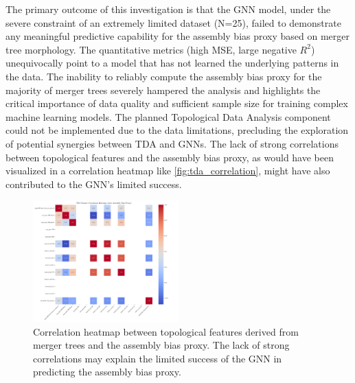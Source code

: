 \documentclass[twocolumn]{aastex631}
\begin{document}
The primary outcome of this investigation is that the GNN model, under the severe constraint of an extremely limited dataset (N=25), failed to demonstrate any meaningful predictive capability for the assembly bias proxy based on merger tree morphology. The quantitative metrics (high MSE, large negative $R^2$) unequivocally point to a model that has not learned the underlying patterns in the data. The inability to reliably compute the assembly bias proxy for the majority of merger trees severely hampered the analysis and highlights the critical importance of data quality and sufficient sample size for training complex machine learning models. The planned Topological Data Analysis component could not be implemented due to the data limitations, precluding the exploration of potential synergies between TDA and GNNs. The lack of strong correlations between topological features and the assembly bias proxy, as would have been visualized in a correlation heatmap like \autoref{fig:tda_correlation}, might have also contributed to the GNN's limited success.

\begin{figure}[htbp]
    \centering
    \includegraphics[width=0.5\textwidth]{../input_files/plots/tda_feature_correlation_heatmap_3_1748137556.png}
    \caption{\label{fig:tda_correlation}Correlation heatmap between topological features derived from merger trees and the assembly bias proxy. The lack of strong correlations may explain the limited success of the GNN in predicting the assembly bias proxy.}
\end{figure}
\end{document}
